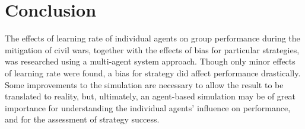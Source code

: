 \section{Conclusion}
The effects of learning rate of individual agents on group performance during the mitigation of civil wars, together with the effects of bias for particular strategies, was researched using a multi-agent system approach. Though only minor effects of learning rate were found, a bias for strategy did affect performance drastically. Some improvements to the simulation are necessary to allow the result to be translated to reality, but, ultimately, an agent-based simulation may be of great importance for understanding the individual agents' influence on performance, and for the assessment of strategy success. 